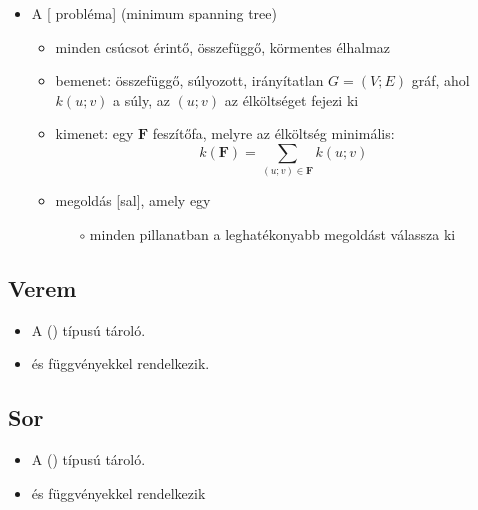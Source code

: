 \documentclass[../../main.tex]{subfiles}
\begin{document}
\begin{itemize}
  \item A [ probléma]
        (minimum spanning tree)
        \begin{itemize}
          \item minden csúcsot érintő, összefüggő,
                körmentes élhalmaz

          \item bemenet: összefüggő, súlyozott,
                irányítatlan $G = (V; E)$ gráf, ahol $k(u; v)$
                a súly, az $(u;v)$ az élköltséget fejezi ki

          \item kimenet: egy $\mathbf{F}$ feszítőfa,
                melyre az élköltség minimális:
                \[k(\mathbf{F}) = \sum_{(u;v) \in \mathbf{F}} k(u;v)\]
          \item megoldás [sal], amely egy
                \begin{itemize}
                  \item[$\circ$] minden pillanatban a leghatékonyabb megoldást válassza ki
                \end{itemize}
        \end{itemize}
\end{itemize}

\subsection{Verem}

\begin{itemize}
  \item A  () 
        típusú tároló.

  \item {} és  függvényekkel rendelkezik.
\end{itemize}

\subsection{Sor}

\begin{itemize}
  \item A  () 
        típusú tároló.

  \item {} és  függvényekkel rendelkezik
\end{itemize}
\end{document}
